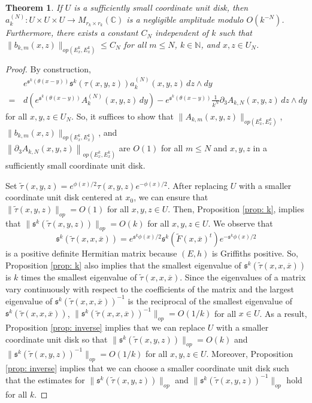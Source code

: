\documentclass{amsart}
\newtheorem{thm}{Theorem}[section]
\theoremstyle{definition}
\theoremstyle{remark}
\numberwithin{equation}{section}
\begin{document}
\begin{thm} \label{thm: bounds}
If $U$ is a sufficiently small coordinate unit disk, then $a_k^{(N)} : U \times U \times U \to M_{r_k \times r_k}(\mathbb{C})$ is a negligible amplitude modulo $O(k^{-N})$. Furthermore, there exists a constant $C_N$ independent of $k$ such that $\|b_{k,m}(x,z)\|_{op(E^k_x,E^k_x)} \leq C_N$ for all $m \leq N$, $k \in \mathbb{N}$, and $x,z \in U_N$.
\end{thm}





\begin{proof}
By construction,
\begin{align*}
& e^{\mathfrak{s}^k(\theta(x-y))} \mathfrak{s}^k(\tau(x,y,z)) a^{(N)}_k(x,y,z) \,dz \wedge dy \\
    = \hspace{2pt} & d(e^{\mathfrak{s}^k(\theta(x-y))} A^{(N)}_k(x,y,z)\, dy) -  e^{\mathfrak{s}^k(\theta(x-y))} \frac{1}{k^N} \partial_3 A_{k,N}(x,y,z) \,dz \wedge dy
\end{align*}
for all $x,y,z \in U_N$. So, it suffices to show that $\|A_{k,m}(x,y,z)\|_{op(E^k_x,E^k_x)}$, $\|b_{k,m}(x,z)\|_{op(E^k_x,E^k_x)}$, and \\ $\left \| \partial_3 A_{k,N}(x,y,z) \right \|_{op(E^k_x,E^k_x)}$ are $O(1)$ for all $m \leq N$ and $x,y,z$ in a sufficiently small coordinate unit disk.

Set $\tilde{\tau}(x,y,z) = e^{\phi(x)/2} \tau(x,y,z) e^{-\phi(x)/2}$. After replacing $U$ with a smaller coordinate unit disk centered at $x_0$, we can ensure that $\|\tilde{\tau}(x,y,z)\|_{op} = O(1)$ for all $x,y,z \in U$. Then, Proposition \ref{prop: k}, implies that $\| \mathfrak{s}^k (\tilde{\tau}(x,y,z)) \|_{op} =O(k)$ for all $x,y,z \in U$. We observe that 
$$
\mathfrak{s}^k(\tilde{\tau}(x,x,\overline{x})) = e^{\mathfrak{s}^k\phi(x)/2}\mathfrak{s}^k \left ( \tilde{F}(x,\overline{x})^t \right ) e^{-\mathfrak{s}^k\phi(x)/2}
$$
is a positive definite Hermitian matrix because $(E,h)$ is Griffiths positive. So, Proposition \ref{prop: k} also implies that the smallest eigenvalue of $\mathfrak{s}^k(\tilde{\tau}(x,x,\overline{x}))$ is $k$ times the smallest eigenvalue of $\tilde{\tau}(x,x,\overline{x})$. Since the eigenvalues of a matrix vary continuously with respect to the coefficients of the matrix and the largest eigenvalue of $\mathfrak{s}^k(\tilde{\tau}(x,x,\overline{x}))^{-1}$ is the reciprocal of the smallest eigenvalue of $\mathfrak{s}^k(\tilde{\tau}(x,x,\overline{x}))$, $\|\mathfrak{s}^k(\tilde{\tau}(x,x,\overline{x}))^{-1}\|_{op} = O(1/k)$ for all $x \in U$. As a result, Proposition \ref{prop: inverse} implies that we can replace $U$ with a smaller coordinate unit disk so that $\|\mathfrak{s}^k (\tilde{\tau}(x,y,z))\|_{op} = O(k)$ and $\| \mathfrak{s}^k (\tilde{\tau}(x,y,z))^{-1}\|_{op} =O(1/k)$ for all $x,y,z \in U$. Moreover, Proposition \ref{prop: inverse} implies that we can choose a smaller coordinate unit disk such that the estimates for $\|\mathfrak{s}^k (\tilde{\tau}(x,y,z))\|_{op}$ and $\| \mathfrak{s}^k (\tilde{\tau}(x,y,z))^{-1}\|_{op}$ hold for all $k$. 


\end{proof}
\end{document}
